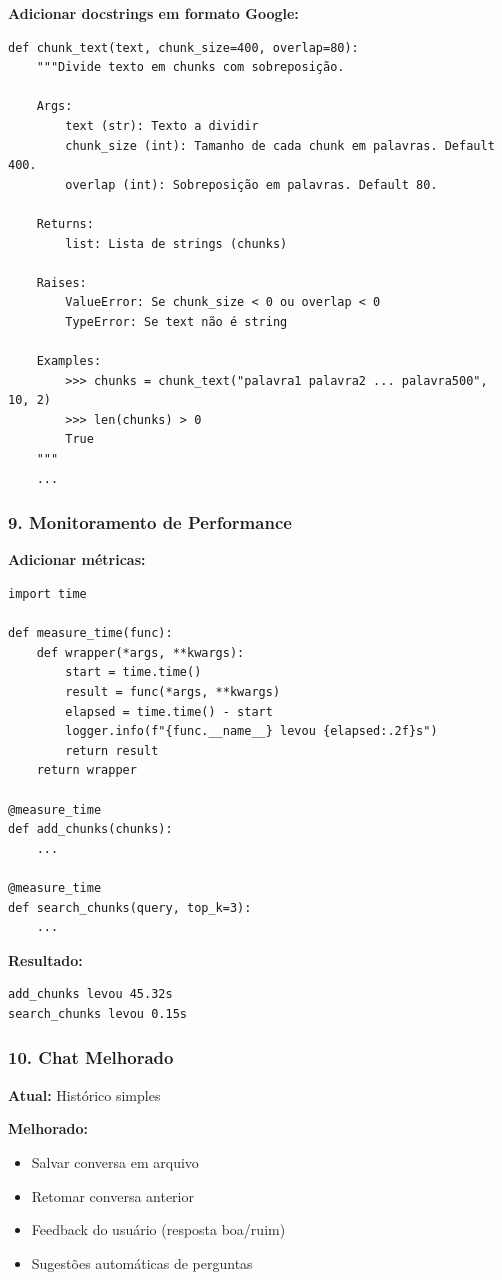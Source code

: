 \documentclass[12pt,a4paper]{article}
\begin{document}
\textbf{Adicionar docstrings em formato Google:}

\begin{lstlisting}
def chunk_text(text, chunk_size=400, overlap=80):
    """Divide texto em chunks com sobreposição.
    
    Args:
        text (str): Texto a dividir
        chunk_size (int): Tamanho de cada chunk em palavras. Default 400.
        overlap (int): Sobreposição em palavras. Default 80.
    
    Returns:
        list: Lista de strings (chunks)
    
    Raises:
        ValueError: Se chunk_size < 0 ou overlap < 0
        TypeError: Se text não é string
    
    Examples:
        >>> chunks = chunk_text("palavra1 palavra2 ... palavra500", 10, 2)
        >>> len(chunks) > 0
        True
    """
    ...
\end{lstlisting}

\subsubsection{9. Monitoramento de Performance}

\textbf{Adicionar métricas:}

\begin{lstlisting}
import time

def measure_time(func):
    def wrapper(*args, **kwargs):
        start = time.time()
        result = func(*args, **kwargs)
        elapsed = time.time() - start
        logger.info(f"{func.__name__} levou {elapsed:.2f}s")
        return result
    return wrapper

@measure_time
def add_chunks(chunks):
    ...

@measure_time
def search_chunks(query, top_k=3):
    ...
\end{lstlisting}

\textbf{Resultado:}
\begin{verbatim}
add_chunks levou 45.32s
search_chunks levou 0.15s
\end{verbatim}

\subsubsection{10. Chat Melhorado}

\textbf{Atual:} Histórico simples

\textbf{Melhorado:}

\begin{itemize}
    \item Salvar conversa em arquivo
    \item Retomar conversa anterior
    \item Feedback do usuário (resposta boa/ruim)
    \item Sugestões automáticas de perguntas
\end{itemize}
\end{document}
